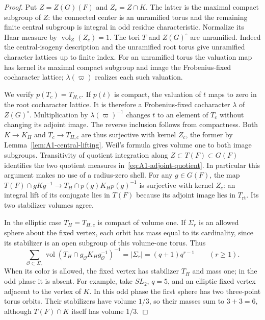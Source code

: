 \documentclass[11pt]{article}
\theoremstyle{definition}
\theoremstyle{remark}
\newcommand{\rt}{\mathrm{rt}}
\newcommand{\vol}{\operatorname{vol}}
\begin{document}
\begin{proof}
Put $Z=Z(G)(F)$ and $Z_c=Z\cap K$.  The latter is the maximal compact
subgroup of $Z$: the connected center is an unramified torus and the
remaining finite central subgroup is integral in odd residue characteristic.
Normalize its Haar measure by $\vol_Z(Z_c)=1$.  The tori $T$ and
$Z(G)^\circ$ are unramified.  Indeed the central-isogeny description and
the unramified root torus give unramified character lattices up to finite
index.  For an unramified torus the valuation map has kernel its maximal
compact subgroup and image the Frobenius-fixed cocharacter lattice;
$\lambda(\varpi)$ realizes each such valuation.

We verify $p(T_c)=T_{H,c}$.  If $p(t)$ is compact, the valuation of $t$
maps to zero in the root cocharacter lattice.  It is therefore a
Frobenius-fixed cocharacter $\lambda$ of $Z(G)^\circ$.  Multiplication
by $\lambda(\varpi)^{-1}$ changes $t$ to an element of $T_c$ without
changing its adjoint image.  The reverse inclusion follows from
compactness.  Both $K\to K_H$ and $T_c\to T_{H,c}$ are thus surjective
with kernel $Z_c$, the former by Lemma~\ref{lem:A1-central-lifting}.
Weil's formula gives volume one to both image subgroups.  Transitivity
of quotient integration along $Z\subset T(F)\subset G(F)$ identifies
the two quotient measures in~\eqref{eq:A1-adjoint-quotient}.
In particular this argument makes no use of a radius-zero shell.
For any $g\in G(F)$, the map
$T(F)\cap gKg^{-1}\to T_H\cap p(g)K_Hp(g)^{-1}$ is surjective with
kernel $Z_c$: an integral lift of its conjugate lies in $T(F)$ because
its adjoint image lies in $T_{\rt}$.  Its two stabilizer volumes agree.

In the elliptic case $T_H=T_{H,c}$ is compact of volume one.  If
$\Sigma_r$ is an allowed sphere about the fixed vertex, each orbit has
mass equal to its cardinality, since its stabilizer is an open subgroup
of this volume-one torus.  Thus
\[
 \sum_{\mathcal O\subset\Sigma_r}
 \vol(T_H\cap g_{\mathcal O}K_Hg_{\mathcal O}^{-1})^{-1}
 =|\Sigma_r|=(q+1)q^{r-1}\qquad(r\geq1).
\]
When its color is allowed, the fixed vertex has stabilizer $T_H$ and
mass one; in the odd phase it is absent.  For example, take $SL_2$,
$q=5$, and an elliptic fixed vertex adjacent to the vertex of $K$.
In this odd phase the first sphere has two three-point torus orbits.  Their stabilizers have volume $1/3$, so their masses sum to
$3+3=6$, although $T(F)\cap K$ itself has volume $1/3$.


\end{proof}
\end{document}

